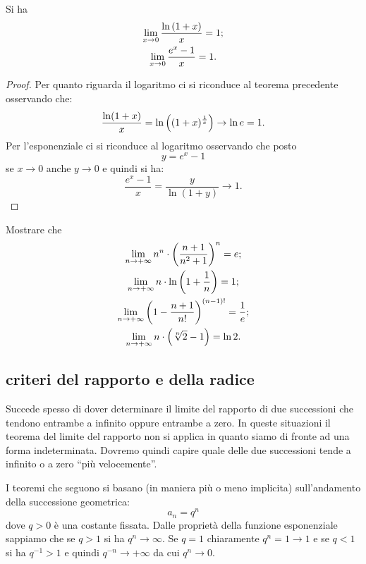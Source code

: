 \begin{corollary}\label{cor:limite_notevole_e}
\mymark{*}%
Si ha
\begin{gather}
 \lim_{x\to 0} \frac{\ln {\left( 1+ x \right)}}{x} = 1; \\
 \lim_{x\to 0} \frac{e^x-1}{x} = 1.
\end{gather}
\end{corollary}
%
\begin{proof}
Per quanto riguarda il logaritmo ci si riconduce al teorema precedente
osservando che:
\[
  \frac{\ln(1+x)}{x}
  = \ln {\left( (1+x)^{\frac 1 {x}} \right)}
  \to \ln e = 1.
\]
Per l'esponenziale ci si riconduce al logaritmo
osservando che posto
\[
  y = e^x-1
\]
se $x\to 0$ anche $y\to 0$ e quindi si ha:
\[
\frac{e^{x}-1}{x} = \frac{y}{\ln(1+y)} \to 1.
\]

\end{proof}

\begin{exercise}
Mostrare che
\begin{gather*}
  \lim_{n\to+\infty} n^n\cdot {\left( \frac{n+1}{n^2+1} \right)}^n = e; \\
  \lim_{n\to+\infty} n\cdot \ln{\left( 1 + \frac 1 n \right)} = 1; \\
  \lim_{n\to+\infty} {\left( 1-\frac{n+1}{n!} \right)}^{(n-1)!} = \frac 1 e; \\
  \lim_{n\to+\infty} n \cdot {\left( \sqrt[n]{2}-1 \right)} = \ln 2.
\end{gather*}
\end{exercise}

\subsection{criteri del rapporto e della radice}

Succede spesso di dover determinare il limite
del rapporto di due successioni che tendono entrambe a infinito
oppure entrambe a zero.
In queste situazioni il teorema del limite del rapporto non
si applica in quanto siamo di fronte ad una forma indeterminata.
Dovremo quindi capire quale delle due successioni
tende a infinito o a zero ``più velocemente''.

I teoremi che seguono si basano (in maniera più o meno implicita)
sull'andamento della successione geometrica:
\[
  a_n = q^n
\]
dove $q>0$ è una costante fissata.
Dalle proprietà della funzione esponenziale 
sappiamo che se $q>1$ si ha $q^n\to \infty$.
Se $q=1$ chiaramente $q^n=1\to 1$
e se $q<1$ si ha $q^{-1}>1$ e quindi $q^{-n} \to +\infty$
da cui $q^n \to 0$.

